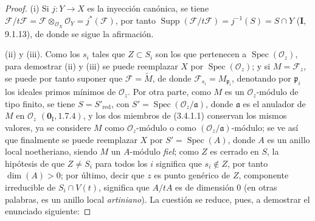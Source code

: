 \begin{proof}
(i) Si $j:Y\to X$ es la inyección canónica, se tiene
$\mathcal F/t\mathcal F=\mathcal F\otimes_{\mathcal O_X}\mathcal O_Y=j^*(\mathcal F)$, por tanto
$\operatorname{Supp}(\mathcal F/t\mathcal F)=j^{-1}(S)=S\cap Y$ (\textbf{I}, 9.1.13), de donde se sigue la afirmación.

(ii) y (iii). Como los $s_i$ tales que $Z\subset S_i$ son los que
pertenecen a $\operatorname{Spec}(\mathcal O_z)$, para demostrar (ii) y (iii)
se puede reemplazar $X$ por $\operatorname{Spec}(\mathcal O_z)$; y si
$M=\mathcal F_z$, se puede por tanto suponer que $\mathcal F=\widetilde M$,
de donde $\mathcal F_{s_i}=M_{\mathfrak p_i}$, denotando por $\mathfrak p_i$
los ideales primos mínimos de $\mathcal O_z$. Por otra parte, como $M$ es un
$\mathcal O_z$-módulo de tipo finito, se tiene $S=S'_{\mathrm{red}}$, con
$S'=\operatorname{Spec}(\mathcal O_z/\mathfrak a)$, donde $\mathfrak a$ es
el anulador de $M$ en $\mathcal O_z$ $(\mathbf{0}_{\mathrm I},1.7.4)$, y los dos
miembros de (3.4.1.1) conservan los mismos valores, ya se considere $M$ como
$\mathcal O_z$-módulo o como $(\mathcal O_z/\mathfrak a)$-módulo; se ve así
que finalmente se puede reemplazar $X$ por
$S'=\operatorname{Spec}(A)$, donde $A$ es un anillo local noetheriano, siendo
$M$ un $A$-módulo \emph{fiel}; como $Z$ es cerrado en $S$, la hipótesis de que
$Z\neq S_i$ para todos los $i$ significa que $s_i\notin Z$, por tanto
$\dim(A)>0$; por último, decir que $z$ es punto genérico de $Z$, componente
irreducible de $S_i\cap V(t)$, significa que $A/tA$ es de dimensión $0$ (en
otras palabras, es un anillo local \emph{artiniano}). La cuestión se reduce, pues, a demostrar
el enunciado siguiente:
\end{proof}
